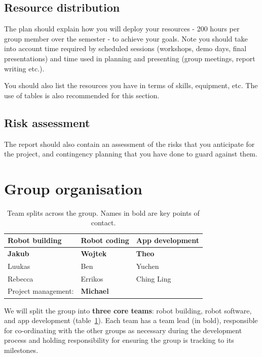 \documentclass{article}
\begin{document}
\subsection{Resource distribution}
The plan should explain how you will deploy your resources - 200 hours per group member over the semester - to achieve your goals. Note you should take into account time required by scheduled sessions (workshops, demo days, final presentations) and time used in planning and presenting (group meetings, report writing etc.). 

You should also list the resources you have in terms of skills, equipment, etc. The use of tables is also recommended for this section.

\subsection{Risk assessment} 
The report should also contain an assessment of the risks that you anticipate for the project, and contingency planning that you have done to guard against them. 

\section{Group organisation}
\begin{table}[]
  \begin{tabular}{lll}
    \hline
    Robot building & Robot coding & App development   \\
    \hline
    {\bf Jakub}          & {\bf Wojtek}       & {\bf Theo}              \\
    Luukas         & Ben          & Yuchen            \\
    Rebecca        & Errikos      & Ching Ling \\
    \hline
    Project management: & {\bf Michael} & \\
  \end{tabular}
  \caption{Team splits across the group. Names in bold are key points of contact.}
  \label{tab:group-split}
\end{table}

We will split the group into {\bf three core teams}: robot building, robot software, and app development (table~\ref{tab:group-split}). Each team has a team lead (in bold), responsible for co-ordinating with the other groups as necessary during the development process and holding responsibility for ensuring the group is tracking to its milestones.
\end{document}
